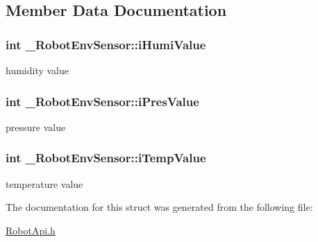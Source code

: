 \subsection{Member Data Documentation}
\hypertarget{struct__RobotEnvSensor_ac1bc83ccd0caff88b187ff45ce320d9b}{
\subsubsection[{i\-Humi\-Value}]{\setlength{\rightskip}{0pt plus 5cm}int \-\_\-\-Robot\-Env\-Sensor\-::i\-Humi\-Value}}\label{struct__RobotEnvSensor_ac1bc83ccd0caff88b187ff45ce320d9b}
humidity value \hypertarget{struct__RobotEnvSensor_ae80bf4f6e67afa6d239b31fa5b8d732e}{
\subsubsection[{i\-Pres\-Value}]{\setlength{\rightskip}{0pt plus 5cm}int \-\_\-\-Robot\-Env\-Sensor\-::i\-Pres\-Value}}\label{struct__RobotEnvSensor_ae80bf4f6e67afa6d239b31fa5b8d732e}
pressure value \hypertarget{struct__RobotEnvSensor_ab0ae3d1ccf7267172b5e03e36fb9b469}{
\subsubsection[{i\-Temp\-Value}]{\setlength{\rightskip}{0pt plus 5cm}int \-\_\-\-Robot\-Env\-Sensor\-::i\-Temp\-Value}}\label{struct__RobotEnvSensor_ab0ae3d1ccf7267172b5e03e36fb9b469}
temperature value 

The documentation for this struct was generated from the following file\-:\begin{DoxyCompactItemize}
\item 
\hyperlink{RobotApi_8h}{Robot\-Api.\-h}\end{DoxyCompactItemize}
